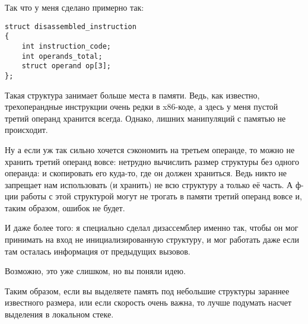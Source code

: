 Так что у меня сделано примерно так:

\begin{lstlisting}
struct disassembled_instruction
{
	int instruction_code;
	int operands_total;
	struct operand op[3];
};
\end{lstlisting}

Такая структура занимает больше места в памяти. Ведь, как известно, трехоперандные инструкции очень редки в x86-коде,
а здесь у меня пустой третий операнд хранится всегда. Однако, лишних манипуляций с памятью не происходит.

Ну а если уж так сильно хочется сэкономить на третьем операнде, то можно не хранить третий операнд вовсе: нетрудно
вычислить размер структуры без одного операнда:  
и скопировать его куда-то, где он должен храниться.
Ведь никто не запрещает нам использовать (и хранить) не всю структуру а только её часть.
А ф-ции работы с этой структурой могут не трогать в памяти третий операнд вовсе и, таким образом, ошибок не будет.

И даже более того: я специально сделал дизассемблер именно так, чтобы он мог принимать на вход не инициализированную
структуру, и мог работать даже если там осталась информация от предыдущих вызовов.

Возможно, это уже слишком, но вы поняли идею.

Таким образом, если вы выделяете память под небольшие структуры зараннее известного размера, или если скорость
очень важна, то лучше подумать насчет выделения в локальном стеке.

